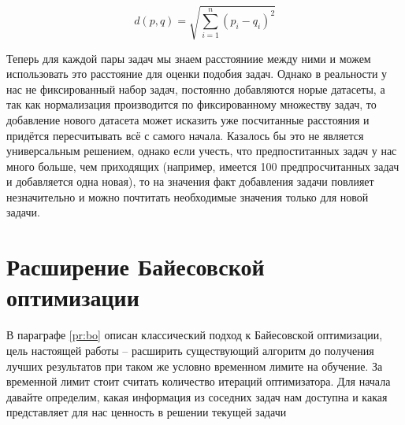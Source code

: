 \documentclass[times,specification,annotation]{itmo-student-thesis}
\begin{document}
	\begin{equation}
	\mathit d(p,q)=\sqrt{\sum_{i=1}^{n} (p_{i}-q_{i})^{2}}
	\label{eq:euclid}
	\end{equation}\par
	Теперь для каждой пары задач мы знаем расстояниие между ними и можем использовать это расстояние для оценки подобия задач. Однако в реальности у нас не фиксированный набор задач, постоянно добавляются норые датасеты, а так как нормализация производится по фиксированному множеству задач, то добавление нового датасета может исказить уже посчитанные расстояния и придётся пересчитывать всё с самого начала. Казалось бы это не является универсальным решением, однако если учесть, что предпоститанных задач у нас много больше, чем приходящих (например, имеется 100 предпросчитанных задач и добавляется одна новая), то на значения факт добавления задачи повлияет незначительно и можно почтитать необходимые значения только для новой задачи.
	
	\section{Расширение Байесовской оптимизации} \label{c:my_bo}
	В параграфе \ref{pr:bo} описан классический подход к Байесовской оптимизации, цель настоящей работы -- расширить существующий алгоритм до получения лучших результатов при таком же условно временном лимите на обучение. За временной лимит стоит считать количество итераций оптимизатора. Для начала давайте определим, какая информация из соседних задач нам доступна и какая представляет для нас ценность в решении текущей задачи\par
\end{document}
